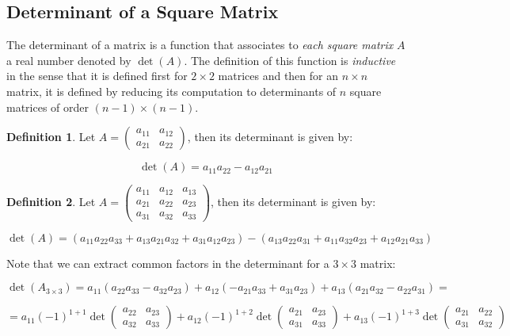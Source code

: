 \documentclass[a4paper,11pt]{article}
\theoremstyle{definition}
\newtheorem{definition}{Definition}
\theoremstyle{plain}
\begin{document}
\subsection{Determinant of a Square
Matrix}\label{determinant-of-a-square-matrix}

The determinant of a matrix is a function that associates to \emph{each
square matrix} \(A\) a real number denoted by \(\det(A)\). The
definition of this function is \emph{inductive} in the sense that it is
defined first for \(2\times 2\) matrices and then for an \(n\times n\)
matrix, it is defined by reducing its computation to determinants of
\(n\) square matrices of order \((n-1)\times (n-1)\).

\begin{definition}
Let \(A = \begin{pmatrix} a_{11} & a_{12} \\ a_{21} & a_{22} \end{pmatrix}\),
then its determinant is given by:

\[
\det(A) = a_{11}a_{22} - a_{12}a_{21}
\]
\end{definition}

\begin{definition}
Let \(A = \begin{pmatrix} a_{11} & a_{12} & a_{13} \\ a_{21} & a_{22} & a_{23} \\ a_{31} & a_{32} & a_{33} \end{pmatrix}\),
then its determinant is given by:

\[
\det(A) = (a_{11}a_{22}a_{33} + a_{13}a_{21}a_{32} + a_{31}a_{12}a_{23}) - (a_{13}a_{22}a_{31} + a_{11}a_{32}a_{23} + a_{12}a_{21}a_{33})
\]
\end{definition}

Note that we can extract common factors in the determinant for a
\(3\times 3\) matrix:

\[
\det\left(A_{3\times 3}\right) = a_{11}(a_{22}a_{33} - a_{32}a_{23}) + a_{12}( - a_{21}a_{33} + a_{31}a_{23}) + a_{13}(a_{21}a_{32} - a_{22}a_{31}) =
\]

\[
= a_{11}(-1)^{1+1}\det\begin{pmatrix}a_{22} & a_{23} \\ a_{32} & a_{33} \end{pmatrix} + a_{12}(-1)^{1+2} \det\begin{pmatrix}a_{21} & a_{23} \\ a_{31} & a_{33} \end{pmatrix} + a_{13}(-1)^{1+3}\det\begin{pmatrix}a_{21} & a_{22} \\ a_{31} & a_{32}\end{pmatrix}
\]
\end{document}

